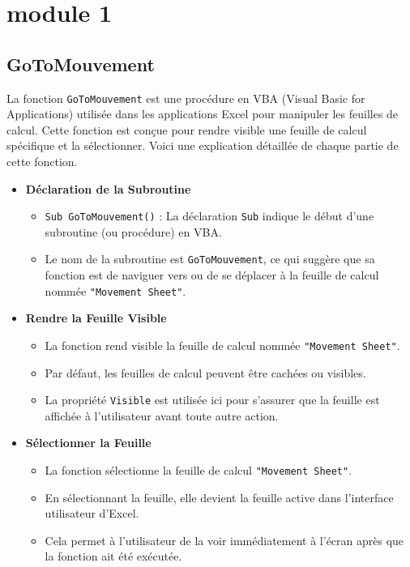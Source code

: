 \documentclass[a4paper, oneside, 12pt, final]{extreport}
\begin{document}
\section{module 1}
\subsection{GoToMouvement}

La fonction \texttt{GoToMouvement} est une procédure en VBA (Visual Basic for Applications) utilisée dans les applications Excel pour manipuler les feuilles de calcul. Cette fonction est conçue pour rendre visible une feuille de calcul spécifique et la sélectionner. Voici une explication détaillée de chaque partie de cette fonction.
\begin{itemize}

\item\textbf{Déclaration de la Subroutine}
\begin{itemize}
    \item \texttt{Sub GoToMouvement()} : La déclaration \texttt{Sub} indique le début d'une subroutine (ou procédure) en VBA.
    \item Le nom de la subroutine est \texttt{GoToMouvement}, ce qui suggère que sa fonction est de naviguer vers ou de se déplacer à la feuille de calcul nommée \texttt{"Movement Sheet"}.
\end{itemize}

\item\textbf{Rendre la Feuille Visible}
\begin{itemize}
    \item La fonction rend visible la feuille de calcul nommée \texttt{"Movement Sheet"}.
    \item Par défaut, les feuilles de calcul peuvent être cachées ou visibles. 
    \item La propriété \texttt{Visible} est utilisée ici pour s'assurer que la feuille est affichée à l'utilisateur avant toute autre action.
\end{itemize}

\item\textbf{Sélectionner la Feuille}
\begin{itemize}
    \item La fonction sélectionne la feuille de calcul \texttt{"Movement Sheet"}.
    \item En sélectionnant la feuille, elle devient la feuille active dans l'interface utilisateur d'Excel.
    \item Cela permet à l'utilisateur de la voir immédiatement à l'écran après que la fonction ait été exécutée.
\end{itemize}


\end{itemize}
\end{document}
